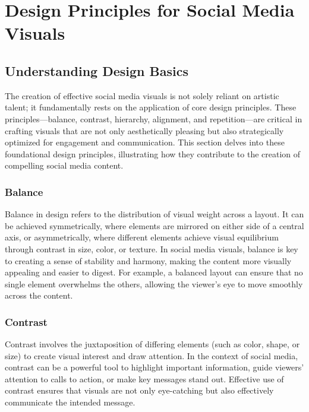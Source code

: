 \documentclass[
]{book}
\begin{document}
\hypertarget{design-principles-for-social-media-visuals}{%
\section{Design Principles for Social Media Visuals}\label{design-principles-for-social-media-visuals}}

\hypertarget{understanding-design-basics}{%
\subsection*{Understanding Design Basics}\label{understanding-design-basics}}

The creation of effective social media visuals is not solely reliant on artistic talent; it fundamentally rests on the application of core design principles. These principles---balance, contrast, hierarchy, alignment, and repetition---are critical in crafting visuals that are not only aesthetically pleasing but also strategically optimized for engagement and communication. This section delves into these foundational design principles, illustrating how they contribute to the creation of compelling social media content.

\hypertarget{balance}{%
\subsubsection*{Balance}\label{balance}}

Balance in design refers to the distribution of visual weight across a layout. It can be achieved symmetrically, where elements are mirrored on either side of a central axis, or asymmetrically, where different elements achieve visual equilibrium through contrast in size, color, or texture. In social media visuals, balance is key to creating a sense of stability and harmony, making the content more visually appealing and easier to digest. For example, a balanced layout can ensure that no single element overwhelms the others, allowing the viewer's eye to move smoothly across the content.

\hypertarget{contrast}{%
\subsubsection*{Contrast}\label{contrast}}

Contrast involves the juxtaposition of differing elements (such as color, shape, or size) to create visual interest and draw attention. In the context of social media, contrast can be a powerful tool to highlight important information, guide viewers' attention to calls to action, or make key messages stand out. Effective use of contrast ensures that visuals are not only eye-catching but also effectively communicate the intended message.
\end{document}
